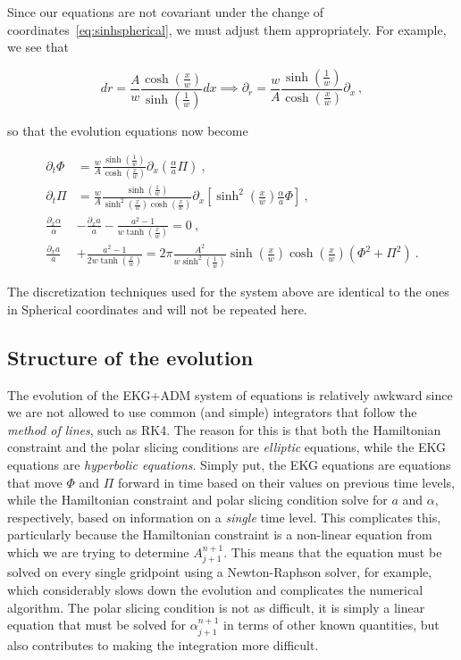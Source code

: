\documentclass[a4paper,11pt]{article}
\renewcommand{\a}{\alpha}
\newcommand{\pd}{\partial}
\newcommand{\lrpar}[1]{\left( #1 \right)}
\newcommand{\lrsquare}[1]{\left[ #1 \right]}
\newcommand{\n}{\noindent}
\newcommand{\eq}[1]{
  \begin{equation}
    #1
  \end{equation}
}
\newcommand{\al}[1]{
  \begin{align}
    #1
  \end{align}
}
\begin{document}
Since our equations are not covariant under the change of coordinates~\eqref{eq:sinhspherical}, we must adjust them appropriately. For example, we see that

\eq{ dr = \frac{A}{w}\frac{\cosh\!\lrpar{\frac{x}{w}}}{\sinh\!\lrpar{\frac{1}{w}}}dx \implies \pd_{r} = \frac{w}{A}\frac{\sinh\!\lrpar{\frac{1}{w}}}{\cosh\!\lrpar{\frac{x}{w}}} \pd_{x}\ ,}

\n so that the evolution equations now become

\al{
  \pd_{t}\Phi &= \frac{w}{A}\frac{\sinh\!\lrpar{\frac{1}{w}}}{\cosh\!\lrpar{\frac{x}{w}}} \pd_{x}\lrpar{\frac{\a}{a}\Pi}\ ,\\
  \pd_{t}\Pi  &= \frac{w}{A}\frac{\sinh\!\lrpar{\frac{1}{w}}}{\sinh^{2}\!\lrpar{\frac{x}{w}}\cosh\!\lrpar{\frac{x}{w}}} \pd_{x}\lrsquare{\sinh^{2}\!\lrpar{\frac{x}{w}}\frac{\a}{a}\Phi}\ ,\\
  \frac{\pd_{x}\a}{\a} &- \frac{\pd_{x} a}{a} - \frac{a^{2}-1}{w\tanh\!\lrpar{\frac{x}{w}}} = 0\ ,\\
  \frac{\pd_{x} a}{a} &+ \frac{a^{2}-1}{2w\tanh\!\lrpar{\frac{x}{w}}} = 2\pi\frac{A^{2}}{w\sinh^{2}\!\lrpar{\frac{1}{w}}}\sinh\!\lrpar{\frac{x}{w}}\cosh\!\lrpar{\frac{x}{w}}\lrpar{\Phi^{2} + \Pi^{2}}\ .
}

\n The discretization techniques used for the system above are identical to the ones in Spherical coordinates and will not be repeated here.

\subsection{Structure of the evolution}

The evolution of the EKG+ADM system of equations is relatively awkward since we are not allowed to use common (and simple) integrators that follow the \emph{method of lines}, such as RK4. The reason for this is that both the Hamiltonian constraint and the polar slicing conditions are \emph{elliptic} equations, while the EKG equations are \emph{hyperbolic equations}. Simply put, the EKG equations are equations that move $\Phi$ and $\Pi$ forward in time based on their values on previous time levels, while the Hamiltonian constraint and polar slicing condition solve for $a$ and $\a$, respectively, based on information on a \emph{single} time level. This complicates this, particularly because the Hamiltonian constraint is a non-linear equation from which we are trying to determine $A^{n+1}_{j+1}$. This means that the equation must be solved on every single gridpoint using a Newton-Raphson solver, for example, which considerably slows down the evolution and complicates the numerical algorithm. The polar slicing condition is not as difficult, it is simply a linear equation that must be solved for $\a^{n+1}_{j+1}$ in terms of other known quantities, but also contributes to making the integration more difficult.
\end{document}
